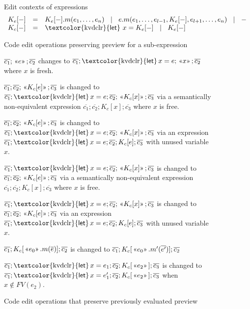 \documentclass[english,crc,references=cleveref]{programming}
\theoremstyle{plain}
\theoremstyle{definition}
\newcommand{\lsep}{\;\;|\;\;}
\newcommand{\kvd}[1]{\textnormal{\textcolor{kvdclr}{\sffamily #1}}}
\newcommand{\rname}[1]{{\sffamily(#1)}}
\newcommand{\ername}[1]{\vspace{0.75em}\rname{#1}\hspace{0.5em}}
\newcommand{\preview}[1]{\,\textnormal{\guillemotleft} #1\textnormal{\guillemotright}\,}
\begin{document}
\begin{figure}[t]
\raggedright
%
{\sffamily Edit contexts of expressions}
\begin{equation*}
\begin{array}{lcl}
K_e[-] &=& K_e[-].m(e_1, \ldots, e_n) ~\lsep~ e.m(e_1, \ldots, e_{l-1}, K_e[-], e_{l+1},\ldots , e_n) ~\lsep~ -\\
K_c[-] &=& \kvd{let}~x = K_e[-] ~\lsep~ K_e[-]\\
\end{array}
\end{equation*}

%
{\sffamily Code edit operations preserving preview for a sub-expression}

\hspace{2.5em}\begin{minipage}[c]{0.868\textwidth}
  \raggedright\setlength{\parindent}{-1em}

  \ername{let-intro-var}
  $\overline{c_1}; \preview{e}; \overline{c_2}$ changes to
  $\overline{c_1}; \kvd{let}\,x = e; \preview{x}; \overline{c_2}$ where $x$ is fresh.

  \ername{let-intro-ins}
  $\overline{c_1}; \overline{c_2}; \preview{K_c[e]}; \overline{c_3}$ is changed to
  $\overline{c_1}; \kvd{let}\,x=e; \overline{c_2}; \preview{K_c[x]}; \overline{c_3}$ via
  a semantically non-equivalent expression
  $\overline{c_1}; \overline{c_2}; K_c[x]; \overline{c_3}$ where $x$ is free.

  \ername{let-intro-del}
  $\overline{c_1}; \overline{c_2}; \preview{K_c[e]}; \overline{c_3}$ is changed to
  $\overline{c_1}; \kvd{let}\,x=e; \overline{c_2}; \preview{K_c[x]}; \overline{c_3}$ via
  an expression $\overline{c_1}; \kvd{let}\,x=e; \overline{c_2}; K_c[e]; \overline{c_3}$
  with unused variable $x$.

  \ername{let-elim-del}
  $\overline{c_1}; \kvd{let}\,x=e; \overline{c_2}; \preview{K_c[x]}; \overline{c_3}$ is changed to
  $\overline{c_1}; \overline{c_2}; \preview{K_c[e]}; \overline{c_3}$ via
  a semantically non-equivalent expression
  $\overline{c_1}; \overline{c_2}; K_c[x]; \overline{c_3}$ where $x$ is free.

  \ername{let-elim-ins}
  $\overline{c_1}; \kvd{let}\,x=e; \overline{c_2}; \preview{K_c[x]}; \overline{c_3}$ is changed to
  $\overline{c_1}; \overline{c_2}; \preview{K_c[e]}; \overline{c_3}$ via
  an expression $\overline{c_1}; \kvd{let}\,x=e; \overline{c_2}; K_c[e]; \overline{c_3}$
  with unused variable $x$.

  \ername{edit-mem}
  $\overline{c_1}; K_c[\preview{e_0}.m(\overline{e})]; \overline{c_2}$ is changed to
  $\overline{c_1}; K_c[\preview{e_0}.m'(\overline{e'})]; \overline{c_2}$

  \ername{edit-let}
  $\overline{c_1}; \kvd{let}\,x=e_1; \overline{c_2}; K_c[\preview{e_2}]; \overline{c_3}$ is changed to
  $\overline{c_1}; \kvd{let}\,x=e'_1; \overline{c_2}; K_c[\preview{e_2}]; \overline{c_3}$ \hspace{2em} when
  $x\notin FV(e_2)$.
\end{minipage}

\caption{Code edit operations that preserve previously evaluated preview}
\label{fig:operations}
%
\end{figure}
\end{document}
